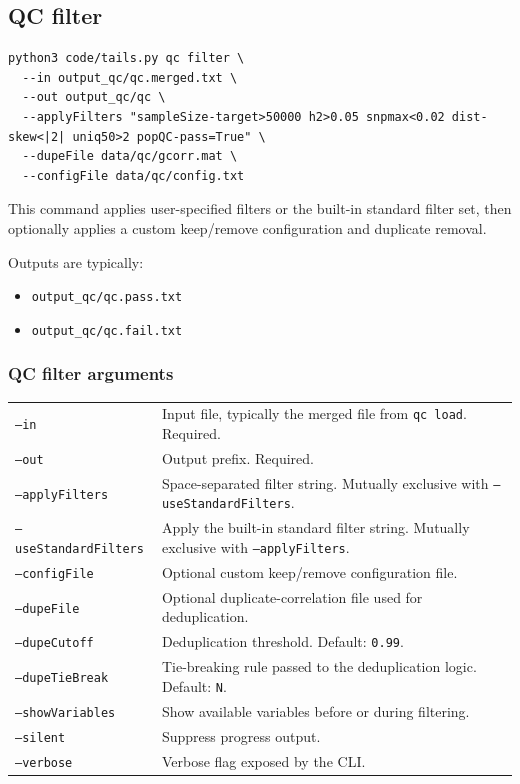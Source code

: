 \documentclass[11pt]{article}
\begin{document}
\subsection{QC filter}

\begin{verbatim}
python3 code/tails.py qc filter \
  --in output_qc/qc.merged.txt \
  --out output_qc/qc \
  --applyFilters "sampleSize-target>50000 h2>0.05 snpmax<0.02 dist-skew<|2| uniq50>2 popQC-pass=True" \
  --dupeFile data/qc/gcorr.mat \
  --configFile data/qc/config.txt
\end{verbatim}

This command applies user-specified filters or the built-in standard filter set, then optionally applies a custom keep/remove configuration and duplicate removal.

Outputs are typically:

\begin{itemize}[nosep]
\item \texttt{output\_qc/qc.pass.txt}
\item \texttt{output\_qc/qc.fail.txt}
\end{itemize}

\subsubsection*{QC filter arguments}

\begin{longtable}{p{3.2cm}p{10.8cm}}
\texttt{--in} & Input file, typically the merged file from \texttt{qc load}. Required. \\
\texttt{--out} & Output prefix. Required. \\
\texttt{--applyFilters} & Space-separated filter string. Mutually exclusive with \texttt{--useStandardFilters}. \\
\texttt{--useStandardFilters} & Apply the built-in standard filter string. Mutually exclusive with \texttt{--applyFilters}. \\
\texttt{--configFile} & Optional custom keep/remove configuration file. \\
\texttt{--dupeFile} & Optional duplicate-correlation file used for deduplication. \\
\texttt{--dupeCutoff} & Deduplication threshold. Default: \texttt{0.99}. \\
\texttt{--dupeTieBreak} & Tie-breaking rule passed to the deduplication logic. Default: \texttt{N}. \\
\texttt{--showVariables} & Show available variables before or during filtering. \\
\texttt{--silent} & Suppress progress output. \\
\texttt{--verbose} & Verbose flag exposed by the CLI. \\
\end{longtable}
\end{document}
